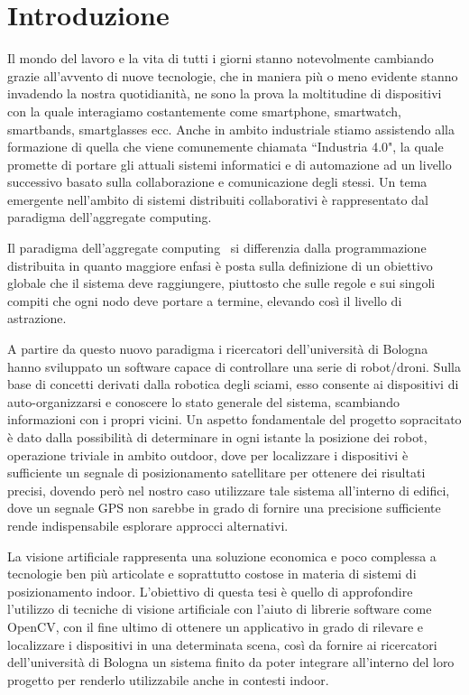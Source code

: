 \documentclass[12pt,a4paper,openright,twoside]{book}
\begin{document}
\chapter{Introduzione}
Il mondo del lavoro e la vita di tutti i giorni stanno notevolmente cambiando grazie all'avvento di nuove tecnologie, che in maniera più o meno evidente stanno invadendo la nostra quotidianità, ne sono la prova la moltitudine di dispositivi con la quale interagiamo costantemente come smartphone, smartwatch, smartbands, smartglasses ecc.
Anche in ambito industriale stiamo assistendo alla formazione di quella che viene comunemente chiamata ``Industria 4.0", la quale promette di portare gli attuali sistemi informatici e di automazione ad un livello successivo basato sulla collaborazione e comunicazione degli stessi.
Un tema emergente nell'ambito di sistemi distribuiti collaborativi è rappresentato dal paradigma dell'aggregate computing.

Il paradigma dell'aggregate computing~\cite{VIROLI2019100486} si differenzia dalla programmazione distribuita in quanto maggiore enfasi è posta sulla definizione di un obiettivo globale che il sistema deve raggiungere, piuttosto che sulle regole e sui singoli compiti che ogni nodo deve portare a termine, elevando così il livello di astrazione.

A partire da questo nuovo paradigma i ricercatori dell'università di Bologna hanno sviluppato un software capace di controllare una serie di robot/droni. Sulla base di concetti derivati dalla robotica degli sciami, esso consente ai dispositivi di auto-organizzarsi e conoscere lo stato generale del sistema, scambiando informazioni con i propri vicini.
Un aspetto fondamentale del progetto sopracitato è dato dalla possibilità di determinare in ogni istante la posizione dei robot, operazione triviale in ambito outdoor, dove per localizzare i dispositivi è sufficiente un segnale di posizionamento satellitare per ottenere dei risultati precisi, dovendo però nel nostro caso utilizzare tale sistema all'interno di edifici, dove un segnale GPS non sarebbe in grado di fornire una precisione sufficiente rende indispensabile esplorare approcci alternativi.

La visione artificiale rappresenta una soluzione economica e poco complessa a tecnologie ben più articolate e soprattutto costose in materia di sistemi di posizionamento indoor. L'obiettivo di questa tesi è quello di approfondire l'utilizzo di tecniche di visione artificiale con l'aiuto di librerie software come OpenCV, con il fine ultimo di ottenere un applicativo in grado di rilevare e localizzare i dispositivi in una determinata scena, così da fornire ai ricercatori dell'università di Bologna un sistema finito da poter integrare all'interno del loro progetto per renderlo utilizzabile anche in contesti indoor.
\end{document}
